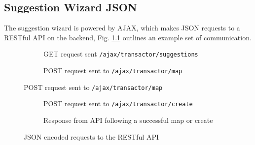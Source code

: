 \begin{appendices}
\chapter{Suggestion Wizard JSON}

The suggestion wizard is powered by AJAX, which makes JSON requests to a RESTful API on the backend, Fig. \ref{fig:json-examples} outlines an example set of communication.

\begin{figure}
    \begin{subfigure}[a]{\textwidth}
        
        \caption{GET request sent \lstinline{/ajax/transactor/suggestions}}
    \end{subfigure}
    
    \begin{subfigure}[b]{\textwidth}
        
        \caption{POST request sent to \lstinline{/ajax/transactor/map}}
    \end{subfigure}
\end{figure}

\begin{figure}
    \ContinuedFloat   
    \begin{subfigure}[c]{\textwidth}
        
        \caption{POST request sent to \lstinline{/ajax/transactor/create}}
    \end{subfigure}
    
    \begin{subfigure}[d]{\textwidth}
        
        \caption{Response from API following a successful map or create}
    \end{subfigure}    

    \caption{JSON encoded requests to the RESTful API}
    \label{fig:json-examples}
\end{figure}

\end{appendices}
